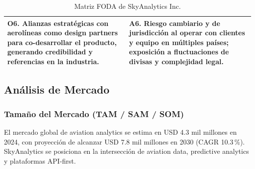 ﻿\documentclass[11pt, letterpaper]{article}
\begin{document}
\begin{table}[H]
\begin{tabularx}{\linewidth}{>{\raggedright\arraybackslash}p{6.5cm} >{\raggedright\arraybackslash}X}
\textbf{O6.} Alianzas estratégicas con aerolíneas como design partners para co-desarrollar el producto, generando credibilidad y referencias en la industria. & \textbf{A6.} Riesgo cambiario y de jurisdicción al operar con clientes y equipo en múltiples países; exposición a fluctuaciones de divisas y complejidad legal. \\

\bottomrule

\end{tabularx}

\caption{Matriz FODA de SkyAnalytics Inc.}

\end{table}



\subsection{Análisis de Mercado}



\subsubsection{Tamaño del Mercado (TAM / SAM / SOM)}



El mercado global de aviation analytics se estima en USD 4.3 mil millones en 2024, con proyección de alcanzar USD 7.8 mil millones en 2030 (CAGR 10.3\,\%). SkyAnalytics se posiciona en la intersección de aviation data, predictive analytics y plataformas API-first.
\end{document}
